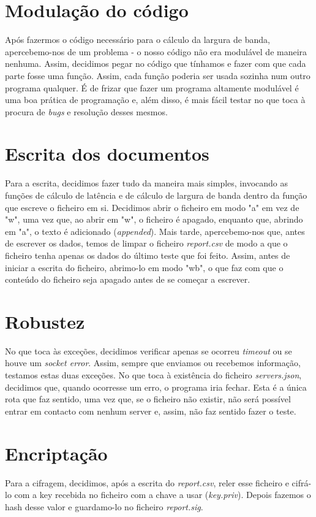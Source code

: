 \documentclass{report}
\begin{document}
\section{Modulação do código}
Após fazermos o código necessário para o cálculo da largura de banda, apercebemo-nos de um problema - o nosso código não era modulável de maneira nenhuma. Assim, decidimos pegar no código que tínhamos e fazer com que cada parte fosse uma função. Assim, cada função poderia ser usada sozinha num outro programa qualquer. É de frizar que fazer um programa altamente modulável é uma boa prática de programação e, além disso, é mais fácil testar no que toca à procura de \textit{bugs} e resolução desses mesmos.

\section{Escrita dos documentos}
Para a escrita, decidimos fazer tudo da maneira mais simples, invocando as funções de cálculo de latência e de cálculo de largura de banda dentro da função que escreve o ficheiro em si. Decidimos abrir o ficheiro em modo "a" em vez de "w", uma vez que, ao abrir em "w", o ficheiro é apagado, enquanto que, abrindo em "a", o texto é adicionado (\textit{appended}).
Mais tarde, apercebemo-nos que, antes de escrever os dados, temos de limpar o ficheiro \textit{report.csv} de modo a que o ficheiro tenha apenas os dados do último teste que foi feito. Assim, antes de iniciar a escrita do ficheiro, abrimo-lo em modo "wb", o que faz com que o conteúdo do ficheiro seja apagado antes de se começar a escrever.

\section{Robustez}
No que toca às exceções, decidimos verificar apenas se ocorreu \textit{timeout} ou se houve um \textit{socket error}. Assim, sempre que enviamos ou recebemos informação, testamos estas duas exceções. 
No que toca à existência do ficheiro \textit{servers.json}, decidimos que, quando ocorresse um erro, o programa iria fechar. Esta é a única rota que faz sentido, uma vez que, se o ficheiro não existir, não será possível entrar em contacto com nenhum server e, assim, não faz sentido fazer o teste.

\section{Encriptação}
Para a cifragem, decidimos, após a escrita do \textit{report.csv}, reler esse ficheiro e cifrá-lo com a key recebida no ficheiro com a chave a usar (\textit{key.priv}). Depois fazemos o hash desse valor e guardamo-lo no ficheiro \textit{report.sig}.
\end{document}
